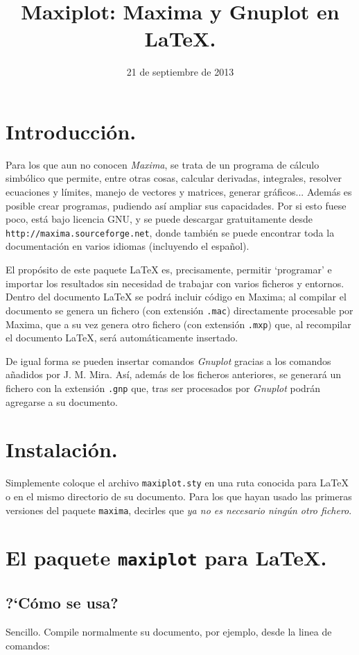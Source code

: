 \documentclass[11pt,a4paper]{article}
\title{Maxiplot: Maxima y Gnuplot en \LaTeX.\\}
\date{21 de septiembre de 2013}
\def\Maxima{\emph{Maxima}}
\def\Gnuplot{\emph{Gnuplot}}
\begin{document}
\maketitle

\section{Introducci\'on.}
Para los que aun no conocen \Maxima, se trata de un programa de c\'alculo simb\'olico que 
permite, entre otras cosas, calcular derivadas, integrales, resolver ecuaciones y
l\'imites, manejo de vectores y matrices, generar gr\'aficos... Adem\'as es posible 
crear programas, pudiendo as\'i ampliar sus capacidades. Por si esto fuese poco, 
est\'a bajo licencia GNU, y se puede descargar gratuitamente desde 
\texttt{http://maxima.sourceforge.net}, donde tambi\'en se puede encontrar toda la 
documentaci\'on en varios idiomas (incluyendo el espa\~nol).

El prop\'osito de este paquete \LaTeX{} es, precisamente, permitir `programar' e importar
los resultados sin necesidad de trabajar con varios ficheros y entornos. Dentro 
del documento \LaTeX{} se podr\'a incluir c\'odigo en Maxima; al compilar el documento
se genera un fichero (con extensi\'on \texttt{.mac}) directamente procesable por Maxima,
que a su vez genera otro fichero (con extensi\'on \texttt{.mxp}) que, al recompilar el 
documento \LaTeX{}, ser\'a autom\'aticamente insertado.

De igual forma se pueden insertar comandos \Gnuplot{} gracias a los comandos a\~nadidos por J. M. Mira. As\'i, adem\'as de los ficheros anteriores, se generar\'a un fichero con la extensi\'on \texttt{.gnp} que, tras ser procesados por \Gnuplot{}
podr\'an agregarse a su documento.

\section{Instalaci\'on.}
Simplemente coloque el archivo \texttt{maxiplot.sty} en una ruta conocida para \LaTeX{} o en el mismo
directorio de su documento. Para los que hayan usado las primeras versiones del paquete \texttt{maxima}, decirles
que \emph{ya no es necesario ning\'un otro fichero}.

\section{El paquete \texttt{maxiplot} para \LaTeX{}.}

\subsection{?`C\'omo se usa?}
Sencillo. Compile normalmente su documento, por ejemplo, desde la linea de comandos:
\end{document}
